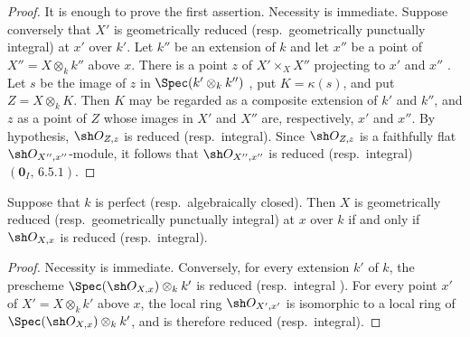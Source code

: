 \begin{proof}
It is enough to prove the first assertion.
Necessity is immediate.
Suppose conversely that $X'$ is geometrically reduced
(resp.\ geometrically punctually integral) at $x'$ over $k'$.
Let $k''$ be an extension of $k$ and let $x''$ be a point of
$X''=X\otimes_k k''$ above $x$.
There is a point $z$ of $X'\times_X X''$ projecting to $x'$ and $x''$
.
Let $s$ be the image of $z$ in
$\Spec(k'\otimes_k k'')$ , put
$K=\kappa(s)$, and put $Z=X\otimes_kK$.
Then $K$ may be regarded as a composite extension of $k'$ and $k''$,
and $z$ as a point of $Z$ whose images in $X'$ and $X''$ are,
respectively, $x'$ and $x''$.
By hypothesis, $\sh O_{Z,z}$ is reduced (resp.\ integral).
Since $\sh O_{Z,z}$ is a faithfully flat
$\sh O_{X'',x''}$-module, it follows that $\sh O_{X'',x''}$ is
reduced (resp.\ integral) $(\mathbf{0}_I,\,6.5.1)$.
\end{proof}

\begin{corollary}[4.6.11]
\label{IV.4.6.11}
Suppose that $k$ is perfect (resp.\ algebraically closed).
Then $X$ is geometrically reduced
(resp.\ geometrically punctually integral) at $x$ over $k$ if and
only if $\sh O_{X,x}$ is reduced (resp.\ integral).
\end{corollary}

\begin{proof}
Necessity is immediate.
Conversely, for every extension $k'$ of $k$, the prescheme
$\Spec(\sh O_{X,x})\otimes_k k'$ is reduced
 (resp.\ integral ).
For every point $x'$ of $X'=X\otimes_k k'$ above $x$, the local ring
$\sh O_{X',x'}$ is isomorphic to a local ring of
$\Spec(\sh O_{X,x})\otimes_k k'$, and is therefore reduced
(resp.\ integral).
\end{proof}

